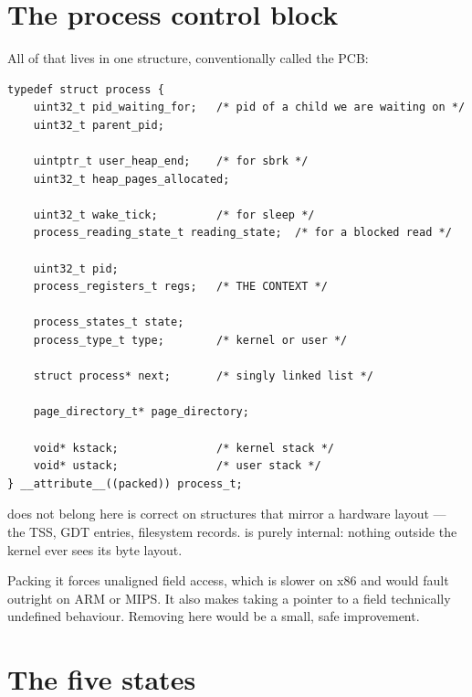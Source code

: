 \section{The process control block}

All of that lives in one structure, conventionally called the PCB:

\begin{lstlisting}[style=c]
typedef struct process {
    uint32_t pid_waiting_for;   /* pid of a child we are waiting on */
    uint32_t parent_pid;

    uintptr_t user_heap_end;    /* for sbrk */
    uint32_t heap_pages_allocated;

    uint32_t wake_tick;         /* for sleep */
    process_reading_state_t reading_state;  /* for a blocked read */

    uint32_t pid;
    process_registers_t regs;   /* THE CONTEXT */

    process_states_t state;
    process_type_t type;        /* kernel or user */

    struct process* next;       /* singly linked list */

    page_directory_t* page_directory;

    void* kstack;               /* kernel stack */
    void* ustack;               /* user stack */
} __attribute__((packed)) process_t;
\end{lstlisting}

\begin{warn}{ does not belong here}
 is correct on structures that mirror a hardware layout --- the
TSS, GDT entries, filesystem records.  is purely internal: nothing outside the
kernel ever sees its byte layout.

Packing it forces unaligned field access, which is slower on x86 and would fault outright on ARM or
MIPS. It also makes taking a pointer to a field technically undefined behaviour. Removing
 here would be a small, safe improvement.
\end{warn}

\section{The five states}

